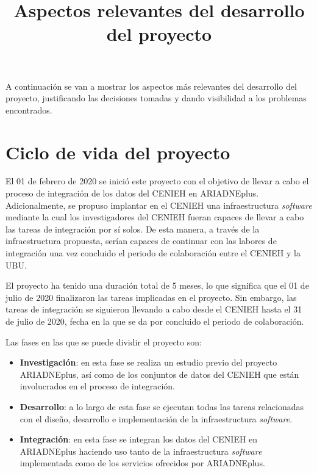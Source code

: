 \documentclass[
]{article}
\title{Aspectos relevantes del desarrollo del proyecto}
\author{}
\date{}
\providecommand{\tightlist}{%
  \setlength{\itemsep}{0pt}\setlength{\parskip}{0pt}}
\begin{document}
\maketitle

A continuación se van a mostrar los aspectos más relevantes del
desarrollo del proyecto, justificando las decisiones tomadas y dando
visibilidad a los problemas encontrados.

\hypertarget{ciclo-de-vida-del-proyecto}{%
\section{Ciclo de vida del proyecto}\label{ciclo-de-vida-del-proyecto}}

El 01 de febrero de 2020 se inició este proyecto con el objetivo de
llevar a cabo el proceso de integración de los datos del CENIEH en
ARIADNEplus. Adicionalmente, se propuso implantar en el CENIEH una
infraestructura \emph{software} mediante la cual los investigadores del
CENIEH fueran capaces de llevar a cabo las tareas de integración por sí
solos. De esta manera, a través de la infraestructura propuesta, serían
capaces de continuar con las labores de integración una vez concluido el
periodo de colaboración entre el CENIEH y la UBU.

El proyecto ha tenido una duración total de 5 meses, lo que significa
que el 01 de julio de 2020 finalizaron las tareas implicadas en el
proyecto. Sin embargo, las tareas de integración se siguieron llevando a
cabo desde el CENIEH hasta el 31 de julio de 2020, fecha en la que se da
por concluido el periodo de colaboración.

Las fases en las que se puede dividir el proyecto son:

\begin{itemize}
\tightlist
\item
  \textbf{Investigación}: en esta fase se realiza un estudio previo del
  proyecto ARIADNEplus, así como de los conjuntos de datos del CENIEH
  que están involucrados en el proceso de integración.
\item
  \textbf{Desarrollo}: a lo largo de esta fase se ejecutan todas las
  tareas relacionadas con el diseño, desarrollo e implementación de la
  infraestructura \emph{software}.
\item
  \textbf{Integración}: en esta fase se integran los datos del CENIEH en
  ARIADNEplus haciendo uso tanto de la infraestructura \emph{software}
  implementada como de los servicios ofrecidos por ARIADNEplus.
\end{itemize}
\end{document}

